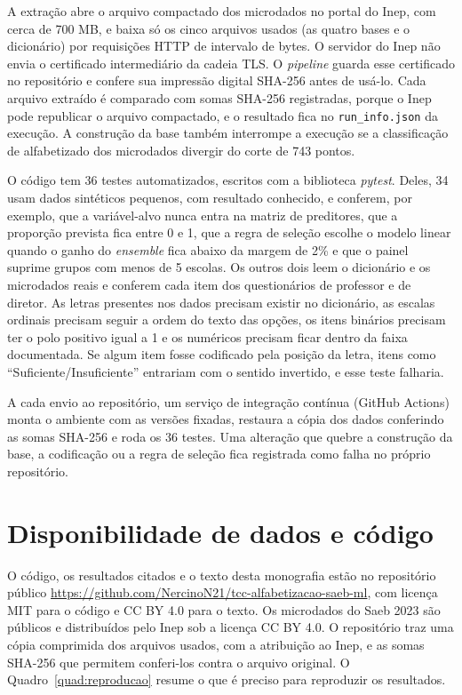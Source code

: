 A extração abre o arquivo compactado dos microdados no portal do Inep, com
cerca de 700 MB, e baixa só os cinco arquivos usados (as quatro bases e o
dicionário) por requisições HTTP de intervalo de bytes. O servidor do Inep
não envia o certificado intermediário da cadeia TLS. O \textit{pipeline} guarda esse certificado no
repositório e confere sua impressão digital SHA-256 antes de usá-lo. Cada
arquivo extraído é comparado com somas SHA-256 registradas, porque o Inep
pode republicar o arquivo compactado, e o resultado fica no
\texttt{run\_info.json} da execução. A construção da base também interrompe
a execução se a classificação de alfabetizado dos microdados divergir do
corte de 743 pontos.

O código tem 36 testes automatizados, escritos com a biblioteca
\textit{pytest}. Deles, 34 usam dados sintéticos pequenos, com resultado
conhecido, e conferem, por exemplo, que a variável-alvo nunca entra na
matriz de preditores, que a proporção prevista fica entre 0 e 1, que a
regra de seleção escolhe o modelo linear quando o ganho do \textit{ensemble}
fica abaixo da margem de 2\% e que o painel suprime grupos com menos de 5
escolas. Os outros dois leem o dicionário e os microdados reais e conferem
cada item dos questionários de professor e de diretor. As letras presentes
nos dados precisam existir no dicionário, as escalas ordinais precisam
seguir a ordem do texto das opções, os itens binários precisam ter o polo
positivo igual a 1 e os numéricos precisam ficar dentro da faixa
documentada. Se algum item fosse codificado pela posição da letra, itens
como ``Suficiente/Insuficiente'' entrariam com o sentido invertido, e esse
teste falharia.

A cada envio ao repositório, um serviço de integração contínua (GitHub
Actions) monta o ambiente com as versões fixadas, restaura a cópia dos
dados conferindo as somas SHA-256 e roda os 36 testes. Uma alteração que
quebre a construção da base, a codificação ou a regra de seleção fica
registrada como falha no próprio repositório.

\section{Disponibilidade de dados e código}
\label{sec:disponibilidade}

O código, os resultados citados e o texto desta monografia estão no
repositório público \url{https://github.com/NercinoN21/tcc-alfabetizacao-saeb-ml},
com licença MIT para o código e CC BY 4.0 para o texto. Os microdados do
Saeb 2023 são públicos e distribuídos pelo Inep sob a licença CC BY 4.0. O
repositório traz uma cópia comprimida dos arquivos usados, com a
atribuição ao Inep, e as somas SHA-256 que permitem conferi-los contra o
arquivo original. O Quadro~\ref{quad:reproducao} resume o que é preciso para
reproduzir os resultados.

